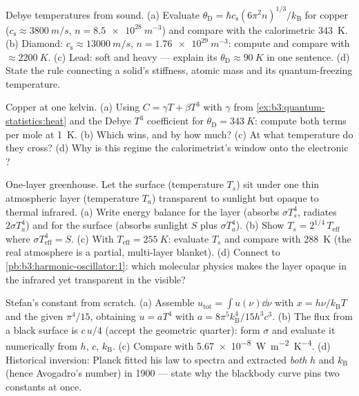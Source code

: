 \begin{exercise}[$\star\star$]\label{exo:b3:photons-phonons:7}
Debye temperatures from sound. (a) Evaluate $\theta_{\text{D}} =
\hbar c_{\text{s}}(6\pi^2n)^{1/3}/k_{\text{B}}$ for copper
($c_{\text{s}} \approx \qty{3800}{m/s}$, $n =
\qty{8.5e28}{m^{-3}}$) and compare with the calorimetric
\qty{343}{K}. (b) Diamond: $c_{\text{s}} \approx
\qty{13000}{m/s}$, $n = \qty{1.76e29}{m^{-3}}$: compute and
compare with $\approx\qty{2200}{K}$. (c) Lead: soft and heavy ---
explain its $\theta_{\text{D}} \approx \qty{90}{K}$ in one
sentence. (d) State the rule connecting a solid's stiffness,
atomic mass and its quantum-freezing temperature.
\end{exercise}

\begin{exercise}[$\star\star$]\label{exo:b3:photons-phonons:8}
Copper at one kelvin. (a) Using $C = \gamma T + \beta T^3$ with
$\gamma$ from \cref{ex:b3:quantum-statistics:heat} and the Debye
$T^3$ coefficient for $\theta_{\text{D}} = \qty{343}{K}$: compute
both terms per mole at \qty{1}{K}. (b) Which wins, and by how
much? (c) At what temperature do they cross? (d) Why is this
regime the calorimetrist's window onto the electronic ?
\end{exercise}

\begin{exercise}[$\star\star$]\label{exo:b3:photons-phonons:9}
One-layer greenhouse. Let the surface (temperature $T_s$) sit
under one thin atmospheric layer (temperature $T_a$) transparent
to sunlight but opaque to thermal infrared. (a) Write energy
balance for the layer (absorbs $\sigma T_s^4$, radiates
$2\sigma T_a^4$) and for the surface (absorbs sunlight $S$ plus
$\sigma T_a^4$). (b) Show $T_s = 2^{1/4}\,T_{\text{eff}}$ where
$\sigma T_{\text{eff}}^4 = S$. (c) With $T_{\text{eff}} =
\qty{255}{K}$: evaluate $T_s$ and compare with \qty{288}{K}
(the real atmosphere is a partial, multi-layer blanket). (d)
Connect to \cref{pb:b3:harmonic-oscillator:1}: which molecular
physics makes the layer opaque in the infrared yet transparent in
the visible?
\end{exercise}

\begin{exercise}[$\star\star\star$]\label{exo:b3:photons-phonons:10}
Stefan's constant from scratch. (a) Assemble $u_{\text{tot}} =
\int u(\nu)\dd\nu$ with $x = h\nu/k_{\text{B}}T$ and the given
$\pi^4/15$, obtaining $u = aT^4$ with $a =
8\pi^5k_{\text{B}}^4/15h^3c^3$. (b) The flux from a black
surface is $c\,u/4$ (accept the geometric quarter): form
$\sigma$ and evaluate it numerically from $h$, $c$,
$k_{\text{B}}$. (c) Compare with \qty{5.67e-8}{W.m^{-2}.K^{-4}}.
(d) Historical inversion: Planck fitted his law to spectra and
extracted \emph{both} $h$ and $k_{\text{B}}$ (hence Avogadro's
number) in 1900 --- state why the blackbody curve pins two
constants at once.
\end{exercise}


